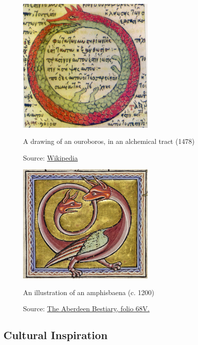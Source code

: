 \begin{uomappendix}
                \begin{figure}[h]
                    \centering
                    \includegraphics[width=0.6\textwidth]{images/Ouroborus.jpg}
                    \caption{A drawing of an ouroboros, in an alchemical tract (1478)}
                    \label{fig:ouroboros}
                    \caption*{Source: \href{https://en.wikipedia.org/wiki/File:Serpiente_alquimica.jpg}{Wikipedia}}
                \end{figure}
    
                \begin{figure}[h]
                    \centering
                    \includegraphics[width=0.6\textwidth]{images/Amphisbaena.png}
                    \caption{An illustration of an amphisbaena (c. 1200)}
                    \label{fig:amphisbaena}
                    \caption*{Source: \href{https://www.abdn.ac.uk/bestiary/ms24/f68v}{The Aberdeen Bestiary, folio 68V.}}
                \end{figure}
    
            \subsection{Cultural Inspiration} \label{app:Cult}
    

\end{uomappendix}
